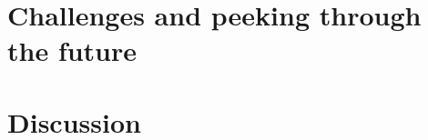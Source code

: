 \documentclass[smallextended,twocolumn,natbib]{svjour3}
\begin{document}
\citep{chang2024look}

\section{Challenges and peeking through the future}
\label{sec:outlook}

\section{Discussion}
\label{sec:discussion}

{

}


\end{document}
